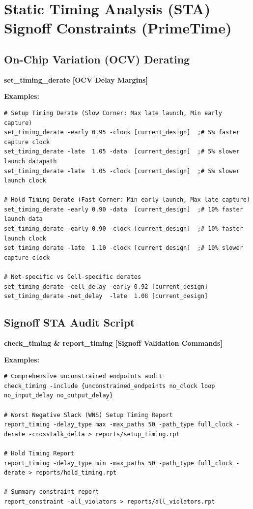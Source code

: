 \documentclass[11pt,a4paper]{article}
\newenvironment{cmdbox}[2]{%
  \begin{mdframed}[style=cmdstyle]%
  {\bfseries\sffamily\color{primary}#1 \hfill \footnotesize\color{mutedgray}[#2]}\par\vspace{3pt}%
}{%
  \end{mdframed}%
}
\begin{document}
\section{Static Timing Analysis (STA) Signoff Constraints (PrimeTime)}

\subsection{On-Chip Variation (OCV) Derating}
\begin{cmdbox}{set\_timing\_derate}{OCV Delay Margins}
\textbf{Examples:}
\begin{lstlisting}[style=sdcstyle]
# Setup Timing Derate (Slow Corner: Max late launch, Min early capture)
set_timing_derate -early 0.95 -clock [current_design]  ;# 5% faster capture clock
set_timing_derate -late  1.05 -data  [current_design]  ;# 5% slower launch datapath
set_timing_derate -late  1.05 -clock [current_design]  ;# 5% slower launch clock

# Hold Timing Derate (Fast Corner: Min early launch, Max late capture)
set_timing_derate -early 0.90 -data  [current_design]  ;# 10% faster launch data
set_timing_derate -early 0.90 -clock [current_design]  ;# 10% faster launch clock
set_timing_derate -late  1.10 -clock [current_design]  ;# 10% slower capture clock

# Net-specific vs Cell-specific derates
set_timing_derate -cell_delay -early 0.92 [current_design]
set_timing_derate -net_delay  -late  1.08 [current_design]
\end{lstlisting}
\end{cmdbox}

\subsection{Signoff STA Audit Script}
\begin{cmdbox}{check\_timing \& report\_timing}{Signoff Validation Commands}
\textbf{Examples:}
\begin{lstlisting}[style=sdcstyle]
# Comprehensive unconstrained endpoints audit
check_timing -include {unconstrained_endpoints no_clock loop no_input_delay no_output_delay}

# Worst Negative Slack (WNS) Setup Timing Report
report_timing -delay_type max -max_paths 50 -path_type full_clock -derate -crosstalk_delta > reports/setup_timing.rpt

# Hold Timing Report
report_timing -delay_type min -max_paths 50 -path_type full_clock -derate > reports/hold_timing.rpt

# Summary constraint report
report_constraint -all_violators > reports/all_violators.rpt
\end{lstlisting}
\end{cmdbox}
\end{document}
